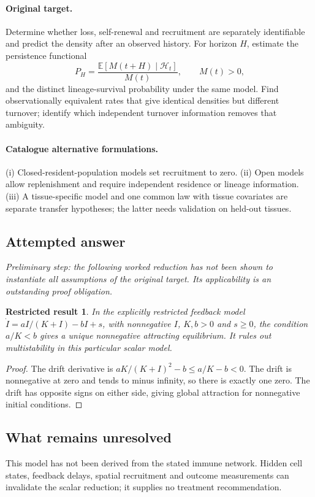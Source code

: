 \documentclass[11pt]{article}
\newcommand{\E}{\mathbb E}
\providecommand{\E}{\mathbb E}
\newtheorem{attemptresult}{Restricted result}[section]
\begin{document}
\paragraph{Original target.}
Determine whether loss, self-renewal and recruitment are separately identifiable and predict the density after an observed history. For horizon $H$, estimate the persistence functional
    \[P_H=\frac{\E[M(t+H)\mid\mathcal H_t]}{M(t)},\qquad M(t)>0,\]
    and the distinct lineage-survival probability under the same model. Find observationally equivalent rates that give identical densities but different turnover; identify which independent turnover information removes that ambiguity.
\paragraph{Catalogue alternative formulations.}
(i) Closed-resident-population models set recruitment to zero. (ii) Open models allow replenishment and require independent residence or lineage information. (iii) A tissue-specific model and one common law with tissue covariates are separate transfer hypotheses; the latter needs validation on held-out tissues.
\subsection{Attempted answer}
\noindent\emph{Preliminary step: the following worked reduction has not been shown to instantiate all assumptions of the original target. Its applicability is an outstanding proof obligation.}

\begin{attemptresult}
In the explicitly restricted feedback model $\dot I=aI/(K+I)-bI+s$, with nonnegative $I$, $K,b>0$ and $s\geq0$, the condition $a/K<b$ gives a unique nonnegative attracting equilibrium. It rules out multistability in this particular scalar model.
\end{attemptresult}
\begin{proof}
The drift derivative is $aK/(K+I)^2-b\leq a/K-b<0$. The drift is nonnegative at zero and tends to minus infinity, so there is exactly one zero. The drift has opposite signs on either side, giving global attraction for nonnegative initial conditions.
\end{proof}
\subsection{What remains unresolved}
This model has not been derived from the stated immune network. Hidden cell states, feedback delays, spatial recruitment and outcome measurements can invalidate the scalar reduction; it supplies no treatment recommendation.
\end{document}
